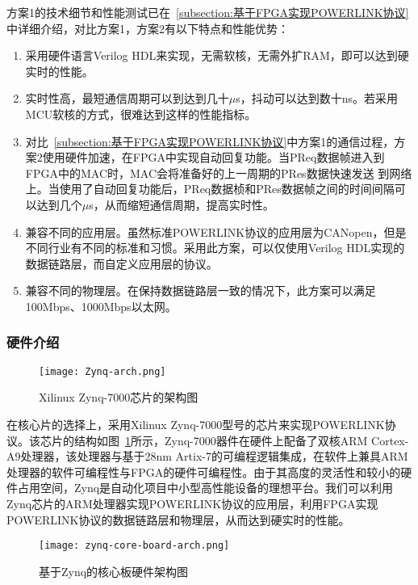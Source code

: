 方案1的技术细节和性能测试已在~\ref{subsection:基于FPGA实现POWERLINK协议}中详细介绍，对比方案1，方案2有以下特点和性能优势：

\begin{enumerate}
  \item 采用硬件语言Verilog HDL来实现，无需软核，无需外扩RAM，即可以达到硬实时的性能。
  \item 实时性高，最短通信周期可以到达到几十$\mu$s，抖动可以达到数十ns。若采用MCU软核的方式，很难达到这样的性能指标。
  \item 对比~\ref{subsection:基于FPGA实现POWERLINK协议}中方案1的通信过程，方案2使用硬件加速，在FPGA中实现自动回复功能。当PReq数据帧进入到FPGA中的MAC时，MAC会将准备好的上一周期的PRes数据快速发送 到网络上。当使用了自动回复功能后，PReq数据桢和PRes数据帧之间的时间间隔可以达到几个$\mu$s，从而缩短通信周期，提高实时性。
  \item 兼容不同的应用层。虽然标准POWERLINK协议的应用层为CANopen，但是不同行业有不同的标准和习惯。采用此方案，可以仅使用Verilog HDL实现的数据链路层，而自定义应用层的协议。
  \item 兼容不同的物理层。在保持数据链路层一致的情况下，此方案可以满足100Mbps、1000Mbps以太网。
\end{enumerate}

\subsubsection{硬件介绍}

\begin{figure}[!htb]
  \centering
  \texttt{[image: Zynq-arch.png]}
  \caption{Xilinux Zynq-7000芯片的架构图}
  \label{fig:Zynq-arch}
\end{figure}

在核心片的选择上，采用Xilinux Zynq-7000型号的芯片来实现POWERLINK协议。该芯片的结构如图~\ref{fig:Zynq-arch}所示，Zynq-7000器件在硬件上配备了双核ARM Cortex-A9处理器，该处理器与基于28nm Artix-7的可编程逻辑集成，在软件上兼具ARM处理器的软件可编程性与FPGA的硬件可编程性。由于其高度的灵活性和较小的硬件占用空间，Zynq是自动化项目中小型高性能设备的理想平台。我们可以利用Zynq芯片的ARM处理器实现POWERLINK协议的应用层，利用FPGA实现POWERLINK协议的数据链路层和物理层，从而达到硬实时的性能。

\begin{figure}[!htb]
  \centering
  \texttt{[image: zynq-core-board-arch.png]}
  \caption{基于Zynq的核心板硬件架构图}
  \label{fig:zynq-core-board-arch}
\end{figure}

